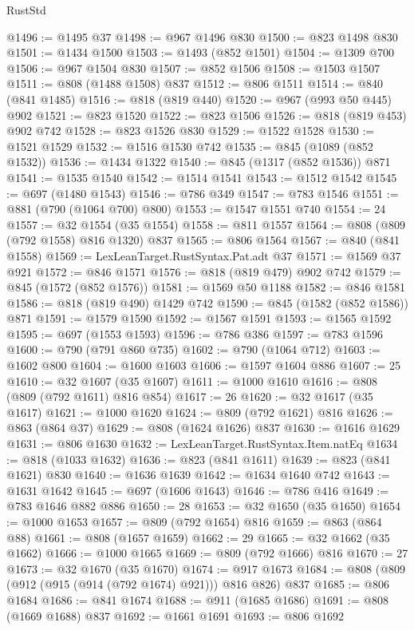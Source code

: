 \begin{lexlean}{RustStd}
\begin{coremodule}
@1496 := @1495 @37
@1498 := @967 @1496 @830
@1500 := @823 @1498 @830
@1501 := @1434 @1500
@1503 := @1493 (@852 @1501)
@1504 := @1309 @700
@1506 := @967 @1504 @830
@1507 := @852 @1506
@1508 := @1503 @1507
@1511 := @808 (@1488 @1508) @837
@1512 := @806 @1511
@1514 := @840 (@841 @1485)
@1516 := @818 (@819 @440)
@1520 := @967 (@993 @50 @445) @902
@1521 := @823 @1520
@1522 := @823 @1506
@1526 := @818 (@819 @453) @902 @742
@1528 := @823 @1526 @830
@1529 := @1522 @1528
@1530 := @1521 @1529
@1532 := @1516 @1530 @742
@1535 := @845 (@1089 (@852 @1532))
@1536 := @1434 @1322
@1540 := @845 (@1317 (@852 @1536)) @871
@1541 := @1535 @1540
@1542 := @1514 @1541
@1543 := @1512 @1542
@1545 := @697 (@1480 @1543)
@1546 := @786 @349
@1547 := @783 @1546
@1551 := @881 (@790 (@1064 @700) @800)
@1553 := @1547 @1551 @740
@1554 := 24
@1557 := @32 @1554 (@35 @1554)
@1558 := @811 @1557
@1564 := @808 (@809 (@792 @1558) @816 @1320) @837
@1565 := @806 @1564
@1567 := @840 (@841 @1558)
@1569 := LexLeanTarget.RustSyntax.Pat.adt @37
@1571 := @1569 @37 @921
@1572 := @846 @1571
@1576 := @818 (@819 @479) @902 @742
@1579 := @845 (@1572 (@852 @1576))
@1581 := @1569 @50 @1188
@1582 := @846 @1581
@1586 := @818 (@819 @490) @1429 @742
@1590 := @845 (@1582 (@852 @1586)) @871
@1591 := @1579 @1590
@1592 := @1567 @1591
@1593 := @1565 @1592
@1595 := @697 (@1553 @1593)
@1596 := @786 @386
@1597 := @783 @1596
@1600 := @790 (@791 @860 @735)
@1602 := @790 (@1064 @712)
@1603 := @1602 @800
@1604 := @1600 @1603
@1606 := @1597 @1604 @886
@1607 := 25
@1610 := @32 @1607 (@35 @1607)
@1611 := @1000 @1610
@1616 := @808 (@809 (@792 @1611) @816 @854)
@1617 := 26
@1620 := @32 @1617 (@35 @1617)
@1621 := @1000 @1620
@1624 := @809 (@792 @1621) @816
@1626 := @863 (@864 @37)
@1629 := @808 (@1624 @1626) @837
@1630 := @1616 @1629
@1631 := @806 @1630
@1632 := LexLeanTarget.RustSyntax.Item.natEq
@1634 := @818 (@1033 @1632)
@1636 := @823 (@841 @1611)
@1639 := @823 (@841 @1621) @830
@1640 := @1636 @1639
@1642 := @1634 @1640 @742
@1643 := @1631 @1642
@1645 := @697 (@1606 @1643)
@1646 := @786 @416
@1649 := @783 @1646 @882 @886
@1650 := 28
@1653 := @32 @1650 (@35 @1650)
@1654 := @1000 @1653
@1657 := @809 (@792 @1654) @816
@1659 := @863 (@864 @88)
@1661 := @808 (@1657 @1659)
@1662 := 29
@1665 := @32 @1662 (@35 @1662)
@1666 := @1000 @1665
@1669 := @809 (@792 @1666) @816
@1670 := 27
@1673 := @32 @1670 (@35 @1670)
@1674 := @917 @1673
@1684 := @808 (@809 (@912 (@915 (@914 (@792 @1674) @921))) @816 @826) @837
@1685 := @806 @1684
@1686 := @841 @1674
@1688 := @911 (@1685 @1686)
@1691 := @808 (@1669 @1688) @837
@1692 := @1661 @1691
@1693 := @806 @1692

\end{coremodule}
\end{lexlean}
